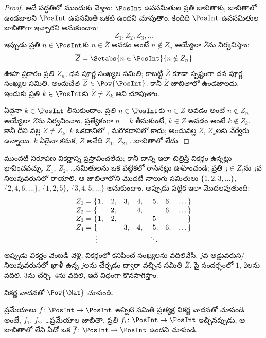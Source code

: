 \documentclass[../../../include/open-logic-section]{subfiles}
\begin{document}
\begin{proof}
అదే పద్ధతిలో ముందుకు వెళ్తాం: $\PosInt$ ఉపసమితుల ప్రతి జాబితాకు,
జాబితాలో ఉండజాలని $\PosInt$ ఉపసమితి ఒకటి ఉందని చూపుతాం. కిందిది
$\PosInt$ ఉపసమితుల జాబితాగా ఇచ్చారని అనుకుందాం:
\[
Z_{1}, Z_{2}, Z_{3}, \dots
\]
ఇప్పుడు ప్రతి $n \in \PosInt$కు $n \in \overline{Z}$ అవడం అంటే
$n \notin Z_{n}$ అయ్యేలా $\overline{Z}$ను నిర్వచిస్తాం:
\[
\overline{Z} = \Setabs{n \in \PosInt}{n \notin Z_n}
\]
ఊహ ప్రకారం ప్రతి $Z_n$, ధన పూర్ణ సంఖ్యల సమితి; కాబట్టి
$\overline{Z}$ కూడా స్పష్టంగా ధన పూర్ణ సంఖ్యల సమితి. అందుచేత
$\overline{Z} \in \Pow{\PosInt}$. కానీ $\overline{Z}$ జాబితాలో
ఉండజాలదు. ఇందుకు ప్రతి $k \in \PosInt$కు $\overline{Z} \neq Z_k$
అని చూపుతాం.

ఏదైనా $k \in \PosInt$ తీసుకుందాం. ప్రతి $n \in \PosInt$కు
$n \in \overline{Z}$ అవడం అంటే $n \notin Z_n$ అయ్యేలా
$\overline{Z}$ను నిర్వచించాం. ప్రత్యేకంగా $n=k$ తీసుకుంటే,
$k \in \overline{Z}$ అవడం అంటే $k \notin Z_k$. కానీ దీని వల్ల
$\overline{Z} \neq Z_k$: $k$ ఒకదానిలో , మరొకదానిలో కాదు;
అందువల్ల $\overline{Z}$, $Z_k$లకు వేర్వేరు  ఉన్నాయి.
$k$ ఏదైనా కనుక, $\overline{Z}$ అనేది $Z_1$, $Z_2$, \dots జాబితాలో లేదు.
\end{proof}

\begin{explain}
ముందటి నిరూపణ వికర్ణాన్ని ప్రస్తావించలేదు; కానీ దాన్ని ఇలా చిత్రిస్తే
వికర్ణం ఉన్నట్లు భావించవచ్చు. $Z_1$, $Z_2$, \dots సమితులను ఒక
పట్టికలో రాసినట్లు ఊహించండి; ప్రతి  $j \in Z_i$ను $j$వ
నిలువువరుసలో రాయాలి. ఆ జాబితాలోని మొదటి నాలుగు సమితులు
$\{1,2,3,\dots\}$, $\{2, 4, 6, \dots\}$, $\{1,2,5\}$,
$\{3,4,5,\dots\}$ అనుకుందాం. అప్పుడు పట్టిక ఇలా మొదలవుతుంది:
\[
\begin{array}{r@{}rrrrrrr}
  Z_1 = \{ & \mathbf{1}, & 2, & 3, & 4, & 5, & 6, & \dots\}\\
  Z_2 = \{ &  & \mathbf{2}, &  & 4, &  & 6, & \dots\}\\
  Z_3 = \{ & 1, & 2, &  &  & 5\phantom{,} &  & \}\\
  Z_4 = \{ &  &  & 3, & \mathbf{4}, & 5, & 6, & \dots\}\\
  \vdots & & & & & \ddots
\end{array}
\]
అప్పుడు వికర్ణం వెంబడి వెళ్లి, వికర్ణంలో కనిపించే సంఖ్యలను వదిలివేసి,
$j$వ అడ్డువరుస/నిలువువరుసలో ఖాళీ ఉన్న $j$లను చేర్చడం ద్వారా వచ్చిన
సమితి $\overline{Z}$. పై సందర్భంలో $1$, $2$లను వదిలి, $3$ను చేర్చి,
$4$ను వదిలి, ఇదే విధంగా కొనసాగిస్తాం.
\end{explain}

\begin{prob}
వికర్ణ వాదనతో $\Pow{\Nat}$  చూపండి.
\end{prob}

\begin{prob}\label{sfr:siz:nen:prob:f-posint}
ప్రమేయాలు $f \colon \PosInt \to \PosInt$ అన్నిటి సమితి
 ప్రత్యక్ష వికర్ణ వాదనతో చూపండి. అంటే,
$f_1$, $f_2$, \dots ప్రమేయాల జాబితా, ప్రతి
$f_i\colon \PosInt \to \PosInt$ ఇచ్చినప్పుడు, ఆ జాబితాలో లేని
ఏదో ఒక $\overline{f}\colon \PosInt \to \PosInt$ ఉందని చూపండి.
\end{prob}
\end{document}
